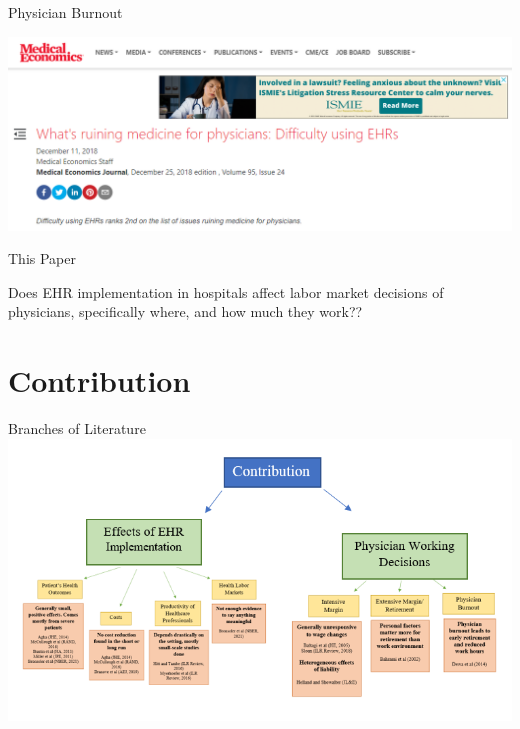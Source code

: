 \documentclass[10pt]{beamer}
\begin{document}
\begin{frame}[noframenumbering]{Physician Burnout}
\begin{center}
    \includegraphics[scale=.3]{graphics/News Clip3.PNG}
\end{center}
\end{frame}

\begin{frame}{This Paper}

Does EHR implementation in hospitals affect labor market decisions of physicians, specifically where, and how much they work??
    
\end{frame}


\section{Contribution}

\begin{frame}{Branches of Literature}
\centering
\includegraphics[scale=.45]{graphics/Contribution_litgraphic.PNG}

\end{frame}
\end{document}
